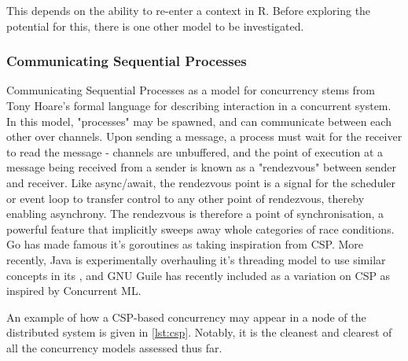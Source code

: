 This depends on the ability to re-enter a context in R.
Before exploring the potential for this, there is one other model to be investigated.

\subsubsection{Communicating Sequential Processes}

Communicating Sequential Processes as a model for concurrency stems from Tony Hoare's formal language for describing interaction in a concurrent system\cite{hoare1978communicating}.
In this model, "processes" may be spawned, and can communicate between each other over channels.
Upon sending a message, a process must wait for the receiver to read the message - channels are unbuffered, and the point of execution at a message being received from a sender is known as a "rendezvous" between sender and receiver.
Like async/await, the rendezvous point is a signal for the scheduler or event loop to transfer control to any other point of rendezvous, thereby enabling asynchrony.
The rendezvous is therefore a point of synchronisation, a powerful feature that implicitly sweeps away whole categories of race conditions.
Go has made famous it's goroutines as taking inspiration from CSP\cite{gomem2014}.
More recently, Java is experimentally overhauling it's threading model to use similar concepts in its , and GNU Guile has recently included  as a variation on CSP as inspired by Concurrent ML.

An example of how a CSP-based concurrency may appear in a node of the distributed system is given in \cref{lst:csp}.
Notably, it is the cleanest and clearest of all the concurrency models assessed thus far.

